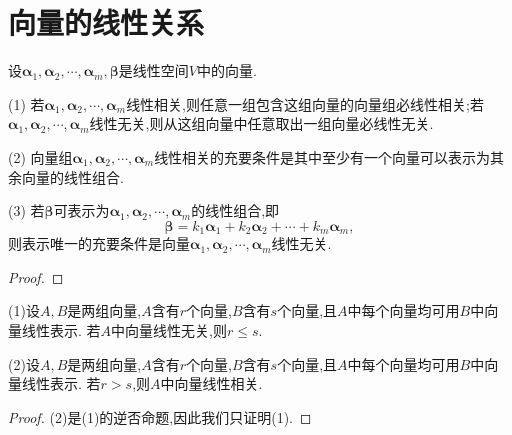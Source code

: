 \documentclass[../../main.tex]{subfiles}
\begin{document}
\section{向量的线性关系}

\begin{theorem}\label{theorem:向量的线性关系定理1}
设\(\boldsymbol{\alpha}_1,\boldsymbol{\alpha}_2,\cdots,\boldsymbol{\alpha}_m,\boldsymbol{\beta}\)是线性空间\(V\)中的向量.

(1) 若\(\boldsymbol{\alpha}_1,\boldsymbol{\alpha}_2,\cdots,\boldsymbol{\alpha}_m\)线性相关,则任意一组包含这组向量的向量组必线性相关;若\(\boldsymbol{\alpha}_1,\boldsymbol{\alpha}_2,\cdots,\boldsymbol{\alpha}_m\)线性无关,则从这组向量中任意取出一组向量必线性无关.

(2) 向量组\(\boldsymbol{\alpha}_1,\boldsymbol{\alpha}_2,\cdots,\boldsymbol{\alpha}_m\)线性相关的充要条件是其中至少有一个向量可以表示为其余向量的线性组合.

(3) 若\(\boldsymbol{\beta}\)可表示为\(\boldsymbol{\alpha}_1,\boldsymbol{\alpha}_2,\cdots,\boldsymbol{\alpha}_m\)的线性组合,即
\[
\boldsymbol{\beta}=k_1\boldsymbol{\alpha}_1 + k_2\boldsymbol{\alpha}_2+\cdots + k_m\boldsymbol{\alpha}_m,
\]
则表示唯一的充要条件是向量\(\boldsymbol{\alpha}_1,\boldsymbol{\alpha}_2,\cdots,\boldsymbol{\alpha}_m\)线性无关.
\end{theorem}
\begin{proof}

\end{proof}

\begin{theorem}\label{theorem:向量的线性关系定理2}
(1)设\(A,B\)是两组向量,\(A\)含有\(r\)个向量,\(B\)含有\(s\)个向量,且\(A\)中每个向量均可用\(B\)中向量线性表示. 若\(A\)中向量线性无关,则\(r\leqslant  s\).

(2)设\(A,B\)是两组向量,\(A\)含有\(r\)个向量,\(B\)含有\(s\)个向量,且\(A\)中每个向量均可用\(B\)中向量线性表示. 若\(r > s\),则\(A\)中向量线性相关.
\end{theorem}
\begin{proof}
(2)是(1)的逆否命题,因此我们只证明(1).
\end{proof}
\end{document}
